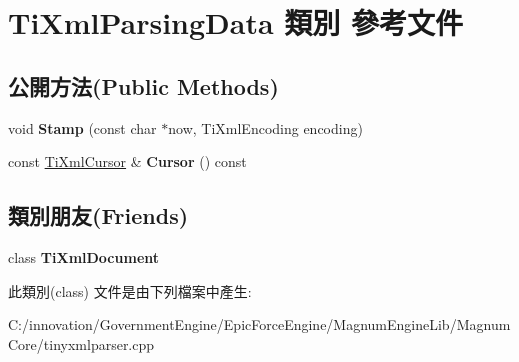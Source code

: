 \hypertarget{class_ti_xml_parsing_data}{}\section{Ti\+Xml\+Parsing\+Data 類別 參考文件}
\label{class_ti_xml_parsing_data}
\subsection*{公開方法(Public Methods)}
\begin{DoxyCompactItemize}
\item 
void {\bfseries Stamp} (const char $\ast$now, Ti\+Xml\+Encoding encoding)\hypertarget{class_ti_xml_parsing_data_a65cee8ab77a36c605db08c84b4c30a7d}{}\label{class_ti_xml_parsing_data_a65cee8ab77a36c605db08c84b4c30a7d}

\item 
const \hyperlink{struct_ti_xml_cursor}{Ti\+Xml\+Cursor} \& {\bfseries Cursor} () const \hypertarget{class_ti_xml_parsing_data_a9e63d965fdb53ff4ac711e105269e918}{}\label{class_ti_xml_parsing_data_a9e63d965fdb53ff4ac711e105269e918}

\end{DoxyCompactItemize}
\subsection*{類別朋友(Friends)}
\begin{DoxyCompactItemize}
\item 
class {\bfseries Ti\+Xml\+Document}\hypertarget{class_ti_xml_parsing_data_a173617f6dfe902cf484ce5552b950475}{}\label{class_ti_xml_parsing_data_a173617f6dfe902cf484ce5552b950475}

\end{DoxyCompactItemize}


此類別(class) 文件是由下列檔案中產生\+:\begin{DoxyCompactItemize}
\item 
C\+:/innovation/\+Government\+Engine/\+Epic\+Force\+Engine/\+Magnum\+Engine\+Lib/\+Magnum\+Core/tinyxmlparser.\+cpp\end{DoxyCompactItemize}
